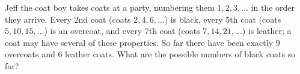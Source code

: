 Jeff the coat boy takes coats at a party, numbering them $1,2,3,\ldots$ in the order they arrive. Every $2$nd coat (coats $2,4,6,\ldots$) is black, every $5$th coat (coats $5,10,15,\ldots$) is an overcoat, and every $7$th coat (coats $7,14,21,\ldots$) is leather; a coat may have several of these properties. So far there have been exactly $9$ overcoats and $6$ leather coats. What are the possible numbers of black coats so far?
